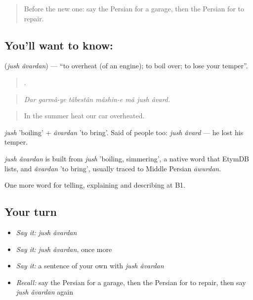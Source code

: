\label{lesson:FA-C427-jush-avardan}



\begin{quote}
Before the new one: say the Persian for a garage, then the Persian for to repair.
\end{quote}

\subsection*{You'll want to know:  }
\textbf{ } (\emph{jush âvardan}) — \textquotedblleft{}to overheat (of an engine); to boil over; to lose your temper\textquotedblright{}.

\begin{quote}
      .
\end{quote}

\begin{quote}
\emph{Dar garmâ-ye tâbestân mâshin-e mâ jush âvard.}
\end{quote}

\begin{quote}
In the summer heat our car overheated.
\end{quote}

\emph{jush} 'boiling' + \emph{âvardan} 'to bring'. Said of people too: \emph{jush âvard} — he lost his temper.

\begin{cousinweb}
\emph{jush âvardan} is built from \emph{jush} 'boiling, simmering', a native word that EtymDB lists, and \emph{âvardan} 'to bring', usually traced to Middle Persian \emph{āwurdan}.
\end{cousinweb}

\begin{grammarlens}[title={What you've built}]
One more word for telling, explaining and describing at B1.
\end{grammarlens}

\subsection*{Your turn}
\begin{itemize}
\raggedright
  \item \emph{Say it:} \emph{jush âvardan}
  \item \emph{Say it:} \emph{jush âvardan}, once more
  \item \emph{Say it:} a sentence of your own with \emph{jush âvardan}
  \item \emph{Recall:} say the Persian for a garage, then the Persian for to repair, then say \emph{jush âvardan} again
\end{itemize}

